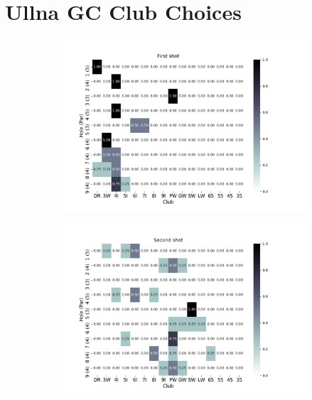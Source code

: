 \documentclass{kththesis}
\begin{document}
\chapter{Ullna GC Club Choices}
\label{app:ullna_club_choices}
\begin{figure}
    \centering
    \begin{subfigure}{\textwidth}
    \centering
    \includegraphics[height=0.3\textheight]{L2ClubChoices/Ludvig_Ullna_Club_Choices_First_Shot.png} 
    \end{subfigure}
    \begin{subfigure}{\textwidth}
    \centering
    \includegraphics[height=0.3\textheight]{L2ClubChoices/Ludvig_Ullna_Club_Choices_Second_Shot.png} 
    \end{subfigure}
    \begin{subfigure}{\textwidth}

\end{subfigure}
\end{figure}
\end{document}
